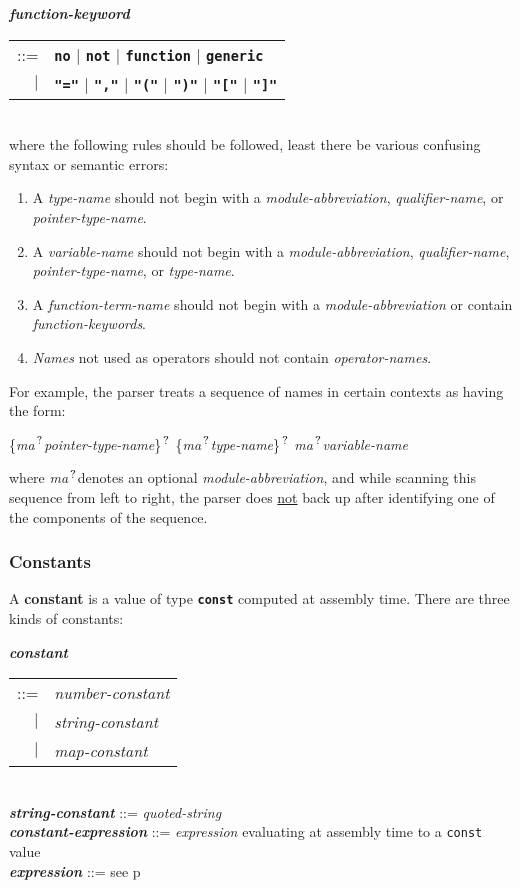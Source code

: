 \documentclass[12pt]{article}
\newcommand{\TT}[1]{{\tt \bfseries #1}}
\newcommand{\QMARK}{{$^{\,\mbox{\footnotesize ?}}$}}
\newcommand{\MA}{{\em ma}\QMARK}
\newcommand{\key}[1]{{\rm \bfseries #1}}
\newcommand{\ttkey}[1]{{\tt \bfseries #1}}
\newcommand{\emkey}[1]{{\em \bfseries #1}}
\newcommand{\pagref}[1]{p\pageref{#1}}
\newenvironment{indpar}[1][0.3in]%
	{\begin{list}{}%
		     {\setlength{\itemsep}{0in}%
		      \setlength{\topsep}{0in}%
		      \setlength{\parsep}{1ex}%
		      \setlength{\labelwidth}{#1}%
		      \setlength{\leftmargin}{#1}%
		      \addtolength{\leftmargin}{\labelsep}}%
	 \item}%
	{\end{list}}
\begin{document}
\begin{indpar}
\emkey{function-keyword}
    \begin{tabular}[t]{rl}
    ::= & \TT{no} $|$ \TT{not} $|$ \TT{function} $|$ \TT{generic} \\
    $|$ & \TT{"="} $|$ \TT{","} $|$ \TT{"("} $|$ \TT{")"} $|$
          \TT{"["} $|$ \TT{"]"}
    \end{tabular}
\\[1ex]
where the following rules should be followed, least there be
various confusing syntax or semantic errors:
\begin{enumerate}
\item
A {\em type-name} should not begin with a {\em module-abbreviation},
{\em qualifier-name}, or {\em pointer-type-name}.
\item
\label{VARIABLE-NAME-RULE}
A {\em variable-name} should not begin with a {\em module-abbreviation},
{\em qualifier-name}, {\em pointer-type-name}, or {\em type-name}.
\item
A {\em function-term-name} should not begin with a {\em module-abbreviation}
or contain {\em function-keywords}.
\item
{\em Names} not used as operators should not contain {\em operator-names}.
\end{enumerate}
\end{indpar}

For example,
the parser treats a sequence of
names in certain contexts as having the form:
\begin{center}
\{\MA {\em pointer-type-name}\}\QMARK{}
\{\MA {\em type-name}\}\QMARK{}
\MA {\em variable-name}
\end{center}
where \MA denotes an optional {\em module-abbreviation},
and while scanning this sequence from left to right,
the parser does \underline{not} back up after identifying
one of the components of the sequence.

\subsubsection{Constants}
\label{CONSTANTS}

A \key{constant} is a value of type \ttkey{const} computed at
assembly time.  There are three kinds of constants:

\begin{indpar}
\emkey{constant}
    \begin{tabular}[t]{rl}
    ::= & {\em number-constant} \\
    $|$ & {\em string-constant} \\
    $|$ & {\em map-constant} \\
    \end{tabular} \\
\emkey{string-constant} ::= {\em quoted-string}
\\[0.5ex]
\emkey{constant-expression}\label{CONSTANT-EXPRESSION}
    ::= {\em expression} evaluating at assembly time to a {\tt const} value
\\[0.5ex]
\emkey{expression} ::= see \pagref{EXPRESSION}
\end{indpar}
\end{document}
